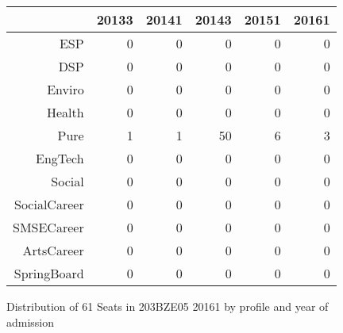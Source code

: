 \documentclass{article}\usepackage[]{graphicx}\usepackage[]{color}
\begin{document}
\begin{figure}[H]
\centering
\begin{tabular}{rrrrrr}
  \hline
 & 20133 & 20141 & 20143 & 20151 & 20161 \\ 
  \hline
ESP &   0 &   0 &   0 &   0 &   0 \\ 
  DSP &   0 &   0 &   0 &   0 &   0 \\ 
  Enviro &   0 &   0 &   0 &   0 &   0 \\ 
  Health &   0 &   0 &   0 &   0 &   0 \\ 
  Pure &   1 &   1 &  50 &   6 &   3 \\ 
  EngTech &   0 &   0 &   0 &   0 &   0 \\ 
  Social &   0 &   0 &   0 &   0 &   0 \\ 
  SocialCareer &   0 &   0 &   0 &   0 &   0 \\ 
  SMSECareer &   0 &   0 &   0 &   0 &   0 \\ 
  ArtsCareer &   0 &   0 &   0 &   0 &   0 \\ 
  SpringBoard &   0 &   0 &   0 &   0 &   0 \\ 
   \hline
\end{tabular}
\caption{Distribution of 61 Seats in 203BZE05 20161 by profile and year of admission} 
\end{figure}
\end{document}
